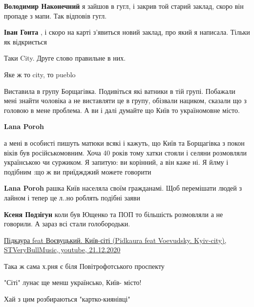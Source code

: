 \begin{itemize}
\begin{itemize}
\textbf{Володимир Наконечний} я зайшов в гугл, і закрив той старий заклад, скоро він пропаде з мапи. Так відповів гугл.

\begin{itemize} %
\textbf{Іван Гонта} , і скоро на карті з'явиться новий заклад, про який я написала. Тільки як відкриється
\end{itemize} %

\end{itemize} %

Таки City. Друге слово правильне в них.

Яке ж то city, то pueblo


Виставила в групу Борщагівка. Подивіться які ватники в тій групі. Побажали мені
знайти чоловіка а не виставляти це в групу, обізвали нациком, сказали що з
головою в мене проблема. А ви і далі думайте що Київ то україномовне місто.

\begin{itemize} %
\textbf{Lana Poroh} 

а мені в особисті пишуть матюки всякі і кажуть, що Київ та Борщагівка з покон
віків був російськомовним. Хоча 40 років тому хатки стояли і селяни розмовляли
українською чи суржиком. Я запитую: ви корінний, а він каже ні. Я йлму і
подібним :що ж ви приїджджий можете говорити

\textbf{Lana Poroh} рашка Київ населяла своїм гражданамі. Щоб перемішати людей з лайном і тепер це л..но роблять подібні заяви

\begin{itemize} %
\textbf{Ксеня Подзігун} коли був Ющенко та ПОП то більшість розмовляли а не говорили. А зараз всі стали голобородьки.
\end{itemize} %

\end{itemize} %


\href{https://youtu.be/8yn9b83qs4k}{%
Підкаура feat Воєвуцький. Київ-сіті (Pidkaura feat Voevudsky. Kyiv-city), STVeryBullMusic, youtube, 21.12.2020%
}

Така ж сама х.рня є біля Повітрофотського проспекту

"Сіті" лунає ще менш українсько, Київ- місто!

Хай з цим розбираються "картко-киянівці"

\end{itemize} %
